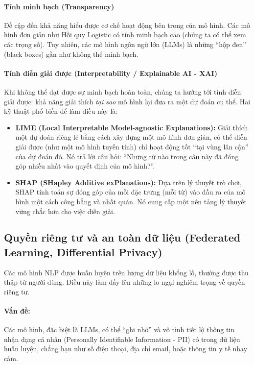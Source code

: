 \paragraph{Tính minh bạch (Transparency)}
Đề cập đến khả năng hiểu được cơ chế hoạt động bên trong của mô hình. Các mô hình đơn giản như Hồi quy Logistic có tính minh bạch cao (chúng ta có thể xem các trọng số). Tuy nhiên, các mô hình ngôn ngữ lớn (LLMs) là những “hộp đen” (black boxes) gần như không thể minh bạch.

\paragraph{Tính diễn giải được (Interpretability / Explainable AI - XAI)}
Khi không thể đạt được sự minh bạch hoàn toàn, chúng ta hướng tới tính diễn giải được: khả năng giải thích \textit{tại sao} mô hình lại đưa ra một dự đoán cụ thể. Hai kỹ thuật phổ biến để làm điều này là:
\begin{itemize}
    \item \textbf{LIME (Local Interpretable Model-agnostic Explanations):} Giải thích một dự đoán riêng lẻ bằng cách xây dựng một mô hình đơn giản, có thể diễn giải được (như một mô hình tuyến tính) chỉ hoạt động tốt “tại vùng lân cận” của dự đoán đó. Nó trả lời câu hỏi: “Những từ nào trong câu này đã đóng góp nhiều nhất vào quyết định của mô hình?”.
    \item \textbf{SHAP (SHapley Additive exPlanations):} Dựa trên lý thuyết trò chơi, SHAP tính toán sự đóng góp của mỗi đặc trưng (mỗi từ) vào đầu ra của mô hình một cách công bằng và nhất quán. Nó cung cấp một nền tảng lý thuyết vững chắc hơn cho việc diễn giải.
\end{itemize}

\subsection{Quyền riêng tư và an toàn dữ liệu (Federated Learning, Differential Privacy)}
\label{ssec:quyen_rieng_tu}

Các mô hình NLP được huấn luyện trên lượng dữ liệu khổng lồ, thường được thu thập từ người dùng. Điều này làm dấy lên những lo ngại nghiêm trọng về quyền riêng tư.

\paragraph{Vấn đề:} Các mô hình, đặc biệt là LLMs, có thể “ghi nhớ” và vô tình tiết lộ thông tin nhận dạng cá nhân (Personally Identifiable Information - PII) có trong dữ liệu huấn luyện, chẳng hạn như số điện thoại, địa chỉ email, hoặc thông tin y tế nhạy cảm.

